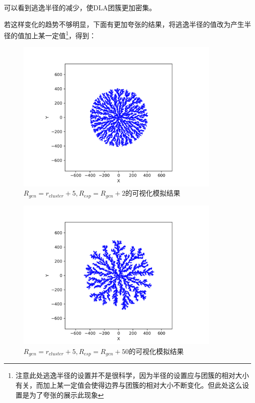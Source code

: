 \documentclass[a4paper,11pt]{article}
\begin{document}
可以看到逃逸半径的减少，使DLA团簇更加密集。

\newpage 若这样变化的趋势不够明显，下面有更加夸张的结果，将逃逸半径的值改为产生半径的值加上某一定值\footnote{注意此处逃逸半径的设置并不是很科学，因为半径的设置应与团簇的相对大小有关，而加上某一定值会使得边界与团簇的相对大小不断变化。但此处这么设置是为了夸张的展示此现象}，得到：


\begin{figure}[!htbp]        
\centering
\includegraphics[bb= 0 0 460.8 345.6, width = 10cm]{改变max/5-7.png}      
\caption{$R_{gen} = r_{cluster} + 5, R_{esp} = R_{gen} + 2$的可视化模拟结果}      
\end{figure}


\begin{figure}[!htbp]        
\centering
\includegraphics[bb= 0 0 460.8 345.6, width = 10cm]{改变max/5-55.png}      
\caption{$R_{gen} = r_{cluster} + 5, R_{esp} = R_{gen} + 50$的可视化模拟结果}      
\end{figure}
\end{document}
